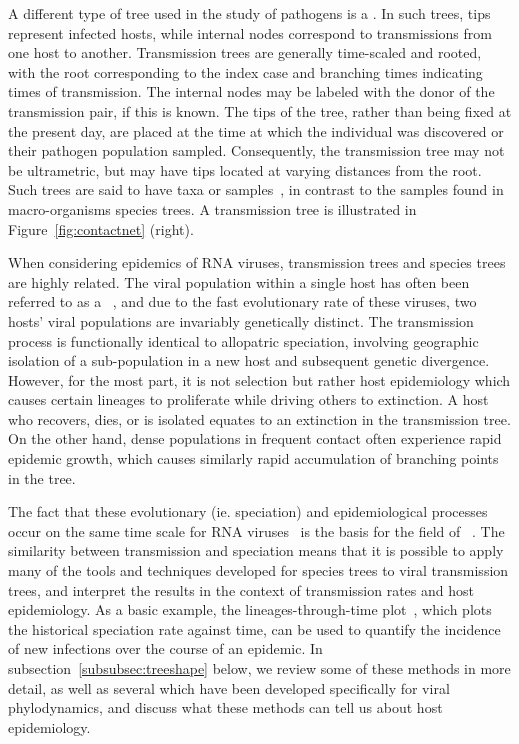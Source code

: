 A different type of tree used in the study of pathogens is a . In such trees, tips represent infected hosts, while internal nodes
correspond to transmissions from one host to another. Transmission trees are
generally time-scaled  and rooted, with the root
corresponding to the index case and branching times indicating times of
transmission. The internal nodes may be labeled with the donor of the
transmission pair, if this is known. The tips of the tree, rather than being
fixed at the present day, are placed at the time at which the individual was
discovered or their pathogen population sampled. Consequently, the transmission
tree may not be ultrametric, but may have tips located at varying distances
from the root. Such trees are said to have  taxa or
samples~\autocite{drummond2003measurably}, in contrast to the
 samples found in macro-organisms species trees. A
transmission tree is illustrated in Figure~\ref{fig:contactnet} (right).

When considering epidemics of RNA viruses, transmission trees and species trees
are highly related. The viral population within a single host has often been
referred to as a ~\autocite{domingo2012viral}, and due to
the fast evolutionary rate of these viruses, two hosts' viral populations are
invariably genetically distinct. The transmission process is functionally
identical to allopatric speciation, involving geographic isolation of a
sub-population in a new host and subsequent genetic divergence. However, for
the most part, it is not selection but rather host epidemiology which causes
certain lineages to proliferate while driving others to extinction. A host who
recovers, dies, or is isolated equates to an extinction in the transmission
tree. On the other hand, dense populations in frequent contact often experience
rapid epidemic growth, which causes similarly rapid accumulation of branching
points in the tree. 

The fact that these evolutionary (ie. speciation) and epidemiological processes
occur on the same time scale for RNA viruses~\autocite{drummond2003measurably}
is the basis for the field of
~\autocite{grenfell2004unifying}. The similarity between
transmission and speciation means that it is possible to apply many of the
tools and techniques developed for species trees to viral transmission trees,
and interpret the results in the context of transmission rates and host
epidemiology. As a basic example, the lineages-through-time
plot~\autocite{nee1992tempo}, which plots the historical speciation rate
against time, can be used to quantify the incidence of new infections over the
course of an epidemic.  In
subsection~\ref{subsubsec:treeshape} below, we review some of these methods in
more detail, as well as several which have been developed specifically for
viral phylodynamics, and discuss what these methods can tell us about host
epidemiology.

